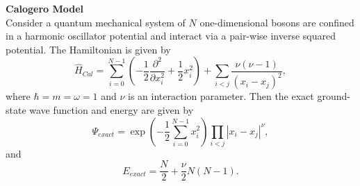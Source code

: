 \documentclass[12pt]{article}
\begin{document}
\noindent \textbf{Calogero Model}\\

\noindent Consider a quantum mechanical system of $N$ one-dimensional bosons are confined in a harmonic oscillator potential and interact via a pair-wise inverse squared potential. The Hamiltonian is given by
\begin{equation}
\hat{H}_{Cal} = \sum_{i=0}^{N-1} \left( -\frac{1}{2} \frac{\partial^2}{\partial x_i^2} + \frac{1}{2} x_i^2 \right) + \sum_{i<j} \frac{\nu (\nu -1)}{(x_i-x_j)^2},
\end{equation}
where $\hbar = m = \omega = 1$ and $\nu$ is an interaction parameter. Then the exact ground-state wave function and energy are given by
\begin{equation}
\Psi_{exact} = \exp \left( - \frac{1}{2} \sum_{i=0}^{N-1} x_i^2 \right) \prod_{i<j} |x_i-x_j|^\nu,
\end{equation}
and
\begin{equation}
E_{exact} = \frac{N}{2} + \frac{\nu}{2} N (N-1).
\end{equation}
\end{document}
